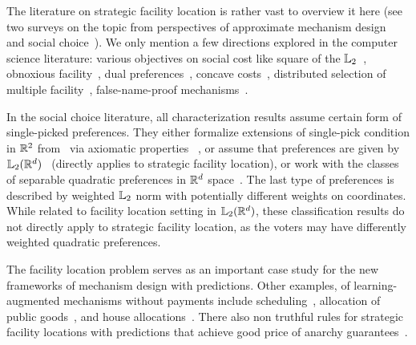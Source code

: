 % 
The literature on strategic facility location is rather vast to overview it here (see two surveys on the topic from perspectives of  approximate mechanism design~\cite{chan2021mechanism} and social choice~\cite{barbera2011strategyproof}). We only mention a few directions explored in the computer science literature: various objectives on social cost like square of the $\lqnorm[2]$~\cite{FeldmanW13}, obnoxious facility~\cite{cheng2013strategy,mei2019}, dual preferences~\cite{FeigenbaumS15,zou15}, concave costs~\cite{FotakisT16}, distributed selection of multiple facility~\cite{filoratsikas2021}, false-name-proof mechanisms~\cite{todo11}. 

In the social choice literature, all characterization results assume certain form of single-picked preferences. They either formalize extensions of single-pick condition in $\reals^2$ from~\cite{moulin1980strategy} via axiomatic properties 
~\cite{barbera1993generalized,barbera1998strategy,schummer2002strategy,ching1997strategy}, or assume that preferences are given by $\lqnorm[2](\reals^d)$~\cite{kim1984nonmanipulability,peters1993range} (directly applies to strategic facility location), or work with the classes of separable quadratic preferences in $\reals^d$ space~\cite{border1983straightforward,peremans1997strategy}. The last type of preferences is described by weighted $\lqnorm[2]$ norm with potentially different weights on coordinates. While related to facility location setting in $\lqnorm[2](\reals^d)$, these classification results do not directly apply to strategic facility location, as the voters may have differently weighted quadratic preferences.

The facility location problem serves as an important case study for the new frameworks of mechanism design with predictions. Other examples, 
of learning-augmented mechanisms without payments 
include scheduling~\cite{XuL22,BalkanskiGT23,ChristodoulouSV24},  allocation of public goods~\cite{BanerjeeGHJM023}, and house allocations~\cite{ChristodoulouSV24}. There also non truthful rules for strategic facility locations with predictions that achieve good price of anarchy guarantees~\cite{ChenGI24}.

 




